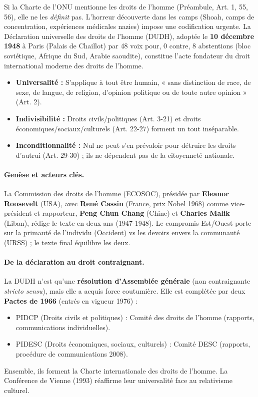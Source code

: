 \documentclass[11pt]{article}
\newcommand{\cle}[1]{{\popxbold\color{popdark}#1}}
\begin{document}
Si la Charte de l'ONU mentionne les droits de l'homme (Préambule, Art. 1, 55, 56), elle ne les \textit{définit} pas. L'horreur découverte dans les camps (Shoah, camps de concentration, expériences médicales nazies) impose une codification urgente. La \cle{Déclaration universelle des droits de l'homme (DUDH)}, adoptée le \textbf{10 décembre 1948} à Paris (Palais de Chaillot) par 48 voix pour, 0 contre, 8 abstentions (bloc soviétique, Afrique du Sud, Arabie saoudite), constitue l'acte fondateur du droit international moderne des droits de l'homme.

\begin{definition}
\begin{itemize}
    \item \textbf{Universalité :} S'applique à tout être humain, « sans distinction de race, de sexe, de langue, de religion, d'opinion politique ou de toute autre opinion » (Art. 2).
    \item \textbf{Indivisibilité :} Droits civils/politiques (Art. 3-21) et droits économiques/sociaux/culturels (Art. 22-27) forment un tout inséparable.
    \item \textbf{Inconditionnalité :} Nul ne peut s'en prévaloir pour détruire les droits d'autrui (Art. 29-30) ; ils ne dépendent pas de la citoyenneté nationale.
\end{itemize}
\end{definition}

\paragraph{Genèse et acteurs clés.} La Commission des droits de l'homme (ECOSOC), présidée par \textbf{Eleanor Roosevelt} (USA), avec \textbf{René Cassin} (France, prix Nobel 1968) comme vice-président et rapporteur, \textbf{Peng Chun Chang} (Chine) et \textbf{Charles Malik} (Liban), rédige le texte en deux ans (1947-1948). Le compromis Est/Ouest porte sur la primauté de l'individu (Occident) vs les devoirs envers la communauté (URSS) ; le texte final équilibre les deux.

\paragraph{De la déclaration au droit contraignant.} La DUDH n'est qu'une \textbf{résolution d'Assemblée générale} (non contraignante \textit{stricto sensu}), mais elle a acquis force coutumière. Elle est complétée par deux \textbf{Pactes de 1966} (entrés en vigueur 1976) :
\begin{itemize}
    \item PIDCP (Droits civils et politiques) : Comité des droits de l'homme (rapports, communications individuelles).
    \item PIDESC (Droits économiques, sociaux, culturels) : Comité DESC (rapports, procédure de communications 2008).
\end{itemize}
Ensemble, ils forment la \cle{Charte internationale des droits de l'homme}. La Conférence de Vienne (1993) réaffirme leur universalité face au relativisme culturel.
\end{document}
